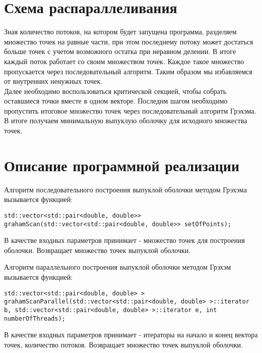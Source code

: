 \documentclass{report}
\begin{document}
\section*{Схема распараллеливания}
Зная количество потоков, на котором будет запущена программа, разделяем множество точек на равные части, при этом последнему потоку может достаться больше точек с учетом возможного остатка при неравном делении. В итоге каждый поток работает со своим множеством точек. Каждое такое множество пропускается через последовательный алгоритм. Таким образом мы избавляемся от внутренних ненужных точек.
\\ Далее необходимо воспользоваться критической секцией, чтобы собрать оставшиеся точки вместе в одном векторе. Последнм шагом необходимо пропустить итоговое множество точек через последовательный алгоритм Грэхэма. В итоге получаем минимальную выпуклую оболочку для исходного множества точек.
\newpage

\section*{Описание программной реализации}
Алгоритм последовательного построения выпуклой оболочки методом Грэхэма вызывается функцией:
\begin{lstlisting}
std::vector<std::pair<double, double>> grahamScan(std::vector<std::pair<double, double>> setOfPoints);
\end{lstlisting}
\par В качестве входных параметров принимает - множество точек для построения оболочки. Возвращает множество точек выпуклой оболочки.
\par Алгоритм параллельного построения выпуклой оболочки методом Грэхэм вызывается функцией:
\begin{lstlisting}
std::vector<std::pair<double, double> > grahamScanParallel(std::vector<std::pair<double, double> >::iterator b, std::vector<std::pair<double, double> >::iterator e, int numberOfThreads);
\end{lstlisting}
\par В качестве входных параметров принимает - итераторы на начало и конец вектора точек, количество потоков. Возвращает множество точек выпуклой оболочки.

\newpage

\end{document}
